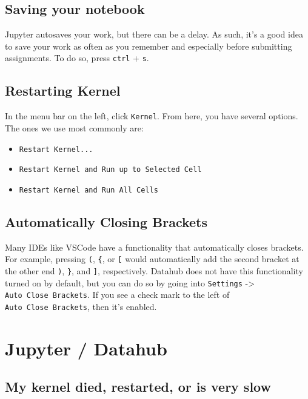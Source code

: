 \documentclass[
  letterpaper,
  DIV=11,
  numbers=noendperiod]{scrreprt}
\providecommand{\tightlist}{%
  \setlength{\itemsep}{0pt}\setlength{\parskip}{0pt}}\usepackage{longtable,booktabs,array}
\begin{document}
\section{Saving your notebook}\label{saving-your-notebook}

Jupyter autosaves your work, but there can be a delay. As such, it's a
good idea to save your work as often as you remember and especially
before submitting assignments. To do so, press \texttt{ctrl} +
\texttt{s}.

\section{Restarting Kernel}\label{restarting-kernel}

In the menu bar on the left, click \texttt{Kernel}. From here, you have
several options. The ones we use most commonly are:

\begin{itemize}
\tightlist
\item
  \texttt{Restart\ Kernel...}
\item
  \texttt{Restart\ Kernel\ and\ Run\ up\ to\ Selected\ Cell}
\item
  \texttt{Restart\ Kernel\ and\ Run\ All\ Cells}
\end{itemize}

\section{Automatically Closing
Brackets}\label{automatically-closing-brackets}

Many IDEs like VSCode have a functionality that automatically closes
brackets. For example, pressing \texttt{(}, \texttt{\{}, or \texttt{{[}}
would automatically add the second bracket at the other end \texttt{)},
\texttt{\}}, and \texttt{{]}}, respectively. Datahub does not have this
functionality turned on by default, but you can do so by going into
\texttt{Settings} -\textgreater{} \texttt{Auto\ Close\ Brackets}. If you
see a check mark to the left of \texttt{Auto\ Close\ Brackets}, then
it's enabled.


\chapter{Jupyter / Datahub}\label{jupyter-datahub}

\section{My kernel died, restarted, or is very
slow}\label{my-kernel-died-restarted-or-is-very-slow}
\end{document}
